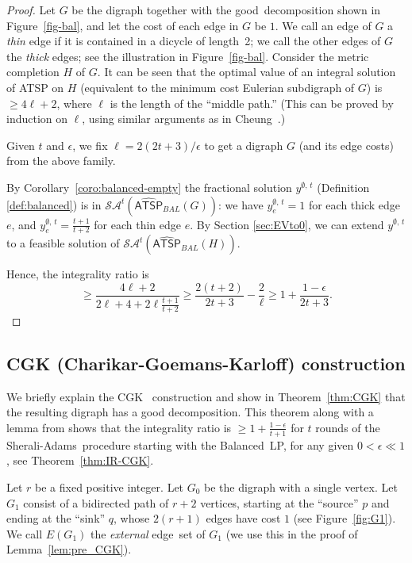 \documentclass[11pt]{article}
\newcommand{\sa}{\textsf{Sherali-Adams}}
\newcommand{\atspbalpolytope}{\widehat{\textsf{ATSP}}_{\mathit{BAL}}}
\newcommand{\yvec}[2]{y^{#1,\,#2}}	\newcommand{\zvec}[2]{y^{#1,\,#2}}	\newcommand{\zveconly}{y}
\newcommand{\saop}{\mathcal{SA}}
\begin{document}
\begin{proof}
Let $G$ be the digraph together with the good~decomposition shown
in Figure~\ref{fig-bal}, and
let the cost of each edge in $G$ be $1$.
We call an edge of $G$ a \emph{thin} edge if it is contained
in a dicycle of length~2;
we call the other edges of $G$ the \emph{thick} edges;
see the illustration in Figure~\ref{fig-bal}.
Consider the metric completion $H$ of $G$.
It can be seen that the optimal value of
an integral solution of ATSP on $H$
(equivalent to the minimum cost Eulerian subdigraph of $G$)
is $\geq 4\ell+2$,
where $\ell$ is the length of the ``middle path.''
(This can be proved by induction on $\ell$, using similar arguments as
in Cheung~\cite[Claim~3~of~Theorem~11]{cheung05}.)

Given $t$ and $\epsilon$, we
fix $\ell= 2(2t+3)/\epsilon$ to get a digraph $G$
(and its edge costs) from the above family.

By Corollary~\ref{coro:balanced-empty}
the fractional solution $\yvec{\emptyset}{t}$
(Definition \ref{def:balanced})
is in $\saop^t(\atspbalpolytope(G))$:
we have
$\yvec{\emptyset}{t}_e=1$ for each thick edge $e$, and
$\yvec{\emptyset}{t}_e=\frac{t+1}{t+2}$ for each thin edge $e$.
By Section \ref{sec:EVto0}, we can extend $\yvec{\emptyset}{t}$ to a
feasible solution of $\saop^t(\atspbalpolytope(H))$.

Hence, the integrality ratio is
\[\geq \frac{4\ell + 2}{2\ell + 4 + 2\ell \frac{t+1}{t+2}} \ge
	\frac{2(t+2)}{2t+3} - \frac{2}{\ell} \ge
	1+ \frac{1 - \epsilon}{2t+3}.
\]
\end{proof}






\subsection{CGK (Charikar-Goemans-Karloff) construction}

We briefly explain the CGK~\cite{CGK06} construction and show in
Theorem~\ref{thm:CGK} that the resulting digraph has a good
decomposition. This theorem along with a lemma from \cite{CGK06}
shows that the integrality ratio is $\ge1+\frac{1-\epsilon}{t+1}$
for $t$ rounds of the \sa\ procedure
starting with the Balanced~LP,
for any given $0<\epsilon\ll{1}$, see Theorem~\ref{thm:IR-CGK}.


Let $r$ be a fixed positive integer.
Let $G_{0}$ be the digraph with a single vertex.
Let $G_{1}$ consist of a bidirected path
of $r+2$ vertices, starting at the ``source'' $p$ and ending
at the ``sink'' $q$, whose $2(r+1)$ edges have cost $1$ (see
Figure~\ref{fig:G1}).
We call $E(G_1)$ the \textit{external} edge~set of $G_1$
(we use this in the proof of Lemma~\ref{lem:pre_CGK}).
\end{document}
